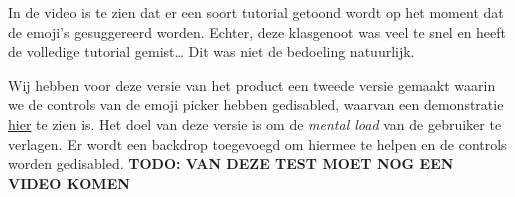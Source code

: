 \documentclass[12pt]{article}
\begin{document}
In de video is te zien dat er een soort tutorial getoond wordt op het moment dat de emoji's gesuggereerd worden.
Echter, deze klasgenoot was veel te snel en heeft de volledige tutorial gemist\dots
Dit was niet de bedoeling natuurlijk.

Wij hebben voor deze versie van het product een tweede versie gemaakt waarin we de controls van de emoji picker hebben gedisabled, waarvan een demonstratie \href{https://cdn.nicecock.eu/hcd/hcd/Attachments/kb-shortcuts-disable-ui.mov}{hier} te zien is.
Het doel van deze versie is om de \textit{mental load} van de gebruiker te verlagen.
Er wordt een backdrop toegevoegd om hiermee te helpen en de controls worden gedisabled.
\colorbox{red!30}{\textbf{TODO: VAN DEZE TEST MOET NOG EEN VIDEO KOMEN}}







\end{document}
